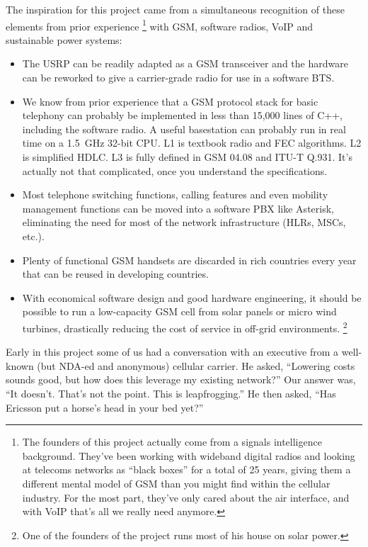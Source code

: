 \documentclass[11pt]{book}
\begin{document}
The inspiration for this project came from a simultaneous recognition of these elements from prior experience%
\footnote{The founders of this project actually come from a signals intelligence background.  They've been working with wideband digital radios and looking at telecoms networks as ``black boxes'' for a total of 25 years, giving them a different mental model of GSM than you might find within the cellular industry.  For the most part, they've only cared about the air interface, and with VoIP that's all we really need anymore.}
with GSM, software radios, VoIP and sustainable power systems:
\begin{itemize}
	\item The USRP can be readily adapted as a GSM transceiver and the hardware can be reworked to give a carrier-grade radio for use in a software BTS.
	\item We know from prior experience that a GSM protocol stack for basic telephony can probably be implemented in less than 15,000 lines of C++, including the software radio. A useful basestation can probably run in real time on a 1.5~GHz 32-bit CPU. L1 is textbook radio and FEC algorithms.  L2 is simplified HDLC.  L3 is fully defined in GSM 04.08 and ITU-T Q.931.  It's actually not that complicated, once you understand the specifications.
	\item Most telephone switching functions, calling features and even mobility management functions can be moved into a software PBX like Asterisk, eliminating the need for most of the network infrastructure (HLRs, MSCs, etc.).
	\item Plenty of functional GSM handsets are discarded in rich countries every year that can be reused in developing countries.
	\item With economical software design and good hardware engineering, it should be possible to run a low-capacity GSM cell from solar panels or micro wind turbines, drastically reducing the cost of service in off-grid environments.%
\footnote{One of the founders of the project runs most of his house on solar power.}
\end{itemize}

Early in this project some of us had a conversation with an executive from a well-known (but NDA-ed and anonymous) cellular carrier. He asked, ``Lowering costs sounds good, but how does this leverage my existing network?'' Our answer was, ``It doesn't. That's not the point. This is leapfrogging.'' He then asked, ``Has Ericsson put a horse's head in your bed yet?''
\end{document}
